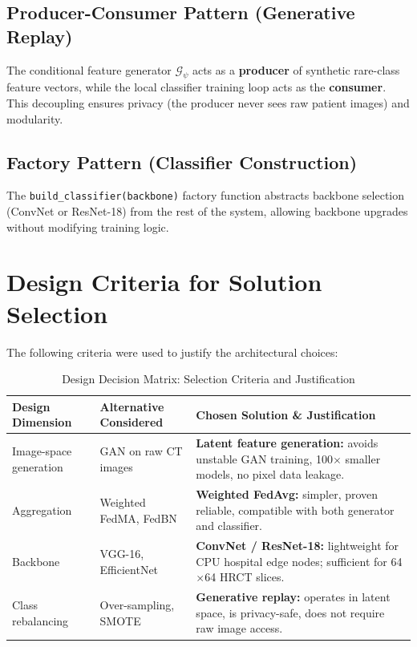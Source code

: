 \documentclass[12pt,a4paper]{report}
\begin{document}
\subsection{Producer-Consumer Pattern (Generative Replay)}
The conditional feature generator $\mathcal{G}_\psi$ acts as a \textbf{producer} of synthetic rare-class feature vectors, while the local classifier training loop acts as the \textbf{consumer}. This decoupling ensures privacy (the producer never sees raw patient images) and modularity.

\subsection{Factory Pattern (Classifier Construction)}
The \texttt{build\_classifier(backbone)} factory function abstracts backbone selection (ConvNet or ResNet-18) from the rest of the system, allowing backbone upgrades without modifying training logic.

\section{Design Criteria for Solution Selection}

The following criteria were used to justify the architectural choices:

\begin{table}[H]
    \centering
    \caption{Design Decision Matrix: Selection Criteria and Justification}
    \label{tab:design_decision}
    \begin{tabular}{|p{4cm}|p{4cm}|p{6cm}|}
        \hline
        \textbf{Design Dimension} & \textbf{Alternative Considered} & \textbf{Chosen Solution \& Justification} \\
        \hline
        Image-space generation & GAN on raw CT images & \textbf{Latent feature generation:} avoids unstable GAN training, 100$\times$ smaller models, no pixel data leakage. \\
        \hline
        Aggregation & Weighted FedMA, FedBN & \textbf{Weighted FedAvg:} simpler, proven reliable, compatible with both generator and classifier. \\
        \hline
        Backbone & VGG-16, EfficientNet & \textbf{ConvNet / ResNet-18:} lightweight for CPU hospital edge nodes; sufficient for 64$\times$64 HRCT slices. \\
        \hline
        Class rebalancing & Over-sampling, SMOTE & \textbf{Generative replay:} operates in latent space, is privacy-safe, does not require raw image access. \\
        \hline
    \end{tabular}
\end{table}
\end{document}
